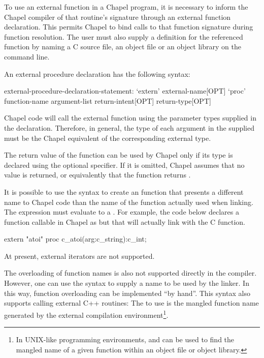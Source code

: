 To use an external function in a Chapel program, it is necessary to inform the
Chapel compiler of that routine's signature through an external function
declaration.  This permits Chapel to bind calls to that function signature
during function resolution.  The user must also supply a definition for the
referenced function by naming a C source file, an object file or an object
library on the  command line. 

An external procedure declaration has the following syntax:
\begin{syntax}
external-procedure-declaration-statement:
  `extern' external-name[OPT] `proc' function-name argument-list return-intent[OPT] return-type[OPT]
\end{syntax}

Chapel code will call the external function using the parameter types supplied
in the  declaration. Therefore, in general, the type of each
argument in the supplied  must be the Chapel
equivalent of the corresponding external type.

The return value of the function can be used by Chapel only if its type is
declared using the optional  specifier.  If it is omitted,
Chapel assumes that no value is returned, or equivalently that the function
returns .

It is possible to use the  syntax to create an
 function that presents a different name to Chapel code than
the name of the function actually used when linking. The
 expression must evaluate to a 
. For example, the code below declares a function callable
in Chapel as  but that will actually link with the C
 function.

\begin{chapel}
  extern "atoi" proc c_atoi(arg:c_string):c_int;
\end{chapel}

At present, external iterators are not supported.  

\begin{future}
The overloading of function names is
also not supported directly in the compiler.  However, one can use
the  syntax to supply a name to be used by the linker.  In
this way, function overloading can be implemented ``by hand''.  This syntax also
supports calling external C++ routines: The  to use is the
mangled function name generated by the external compilation
environment\footnote{In UNIX-like programming environments,  and 
can be used to find the mangled name of a given function within an object file
or object library.}.
\end{future}

